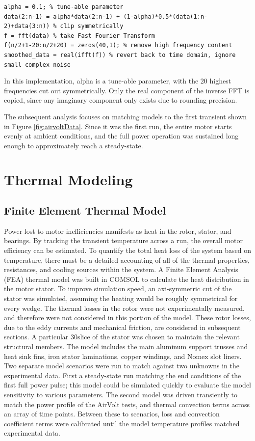 \documentclass[]{aiaa-tc}%
\begin{document}
\begin{verbatim}
alpha = 0.1; % tune-able parameter 
data(2:n-1) = alpha*data(2:n-1) + (1-alpha)*0.5*(data(1:n-2)+data(3:n)) % clip symmetrically
f = fft(data) % take Fast Fourier Transform
f(n/2+1-20:n/2+20) = zeros(40,1); % remove high frequency content
smoothed_data = real(ifft(f)) % revert back to time domain, ignore small complex noise
\end{verbatim}

In this implementation, alpha is a tune-able parameter, with the 20 highest frequencies cut out symmetrically. Only the real component of the inverse FFT is copied, since any imaginary component only exists due to rounding precision.

The subsequent analysis focuses on matching models to the first transient shown in Figure \ref{fig:airvoltData}. Since it was the first run, the entire motor starts evenly at ambient conditions, and the full power operation was sustained long enough to approximately reach a steady-state.

\section{Thermal Modeling}

\subsection{Finite Element Thermal Model}

Power lost to motor inefficiencies manifests as heat in the rotor, stator, and bearings. By tracking the transient temperature across a run, the overall motor efficiency can be estimated. To quantify the total heat loss of the system based on temperature, there must be a detailed accounting of all of the thermal properties, resistances, and cooling sources within the system. A Finite Element Analysis (FEA) thermal model was built in COMSOL to calculate the heat distribution in the motor stator. To improve simulation speed, an axi-symmetric cut of the stator was simulated, assuming the heating would be roughly symmetrical for every wedge. The thermal losses in the rotor were not experimentally measured, and therefore were not considered in this portion of the model. These rotor losses, due to the eddy currents and mechanical friction, are considered in subsequent sections. A particular 30\degree  slice of the stator was chosen to maintain the relevant structural members. The model includes the main aluminum support trusses and heat sink fins, iron stator laminations, copper windings, and Nomex slot liners. Two separate model scenarios were run to match against two unknowns in the experimental data. First a steady-state run matching the end conditions of the first full power pulse; this model could be simulated quickly to evaluate the model sensitivity to various parameters. The second model was driven transiently to match the power profile of the AirVolt tests, and thermal convection terms across an array of time points. Between these to scenarios, loss and convection coefficient terms were calibrated until the model temperature profiles matched experimental data.
\end{document}

